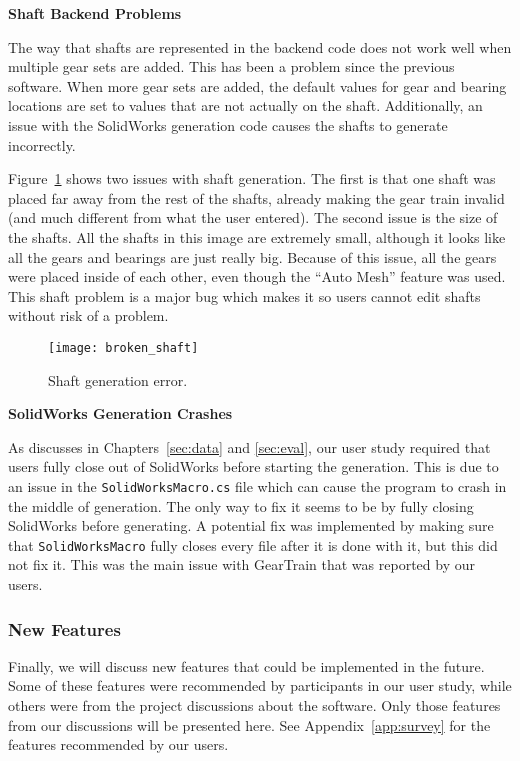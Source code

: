 \begin{doublespace}
\noindent\textbf{Shaft Backend Problems}

\noindent The way that shafts are represented in the backend code does not work well when multiple gear sets are added. This has been a problem since the previous software. When more gear sets are added, the default values for gear and bearing locations are set to values that are not actually on the shaft. Additionally, an issue with the SolidWorks generation code causes the shafts to generate incorrectly.

Figure~\ref{fig:broken_shaft} shows two issues with shaft generation. The first is that one shaft was placed far away from the rest of the shafts, already making the gear train invalid (and much different from what the user entered). The second issue is the size of the shafts. All the shafts in this image are extremely small, although it looks like all the gears and bearings are just really big. Because of this issue, all the gears were placed inside of each other, even though the ``Auto Mesh'' feature was used. This shaft problem is a major bug which makes it so users cannot edit shafts without risk of a problem.

\begin{figure}[htbp]
    \centering
    \texttt{[image: broken\_shaft]}
    \caption{Shaft generation error.}
    \label{fig:broken_shaft}
\end{figure}

\noindent\textbf{SolidWorks Generation Crashes}

\noindent As discusses in Chapters~\ref{sec:data} and \ref{sec:eval}, our user study required that users fully close out of SolidWorks before starting the generation. This is due to an issue in the \texttt{SolidWorksMacro.cs} file which can cause the program to crash in the middle of generation. The only way to fix it seems to be by fully closing SolidWorks before generating. A potential fix was implemented by making sure that \texttt{SolidWorksMacro} fully closes every file after it is done with it, but this did not fix it. This was the main issue with GearTrain that was reported by our users.

\subsubsection{New Features}
Finally, we will discuss new features that could be implemented in the future. Some of these features were recommended by participants in our user study, while others were from the project discussions about the software. Only those features from our discussions will be presented here. See Appendix~\ref{app:survey} for the features recommended by our users.


\end{doublespace}
